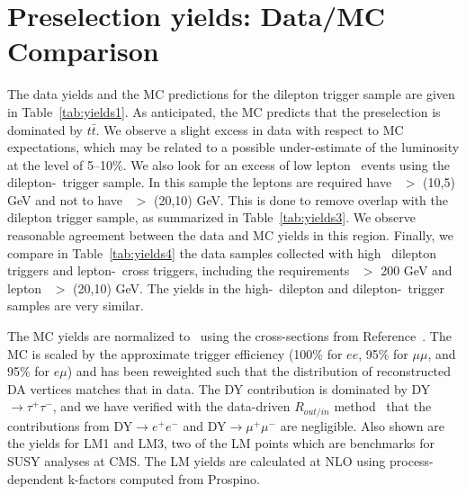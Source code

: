 \section{Preselection yields: Data/MC Comparison}
\label{sec:yields}

The data yields and the MC predictions for the dilepton trigger sample are given in Table~\ref{tab:yields1}. 
As anticipated, the MC predicts that the preselection is dominated by $t\bar{t}$.  
We observe a slight excess in data with respect to MC expectations, which may be
related to a possible under-estimate of the luminosity at the level of 5--10\%.
We also look for an excess of low lepton \pt\ events using the dilepton-\Ht\ trigger sample.
In this sample the leptons are required have \pt\ $>$ (10,5) GeV and not to have \pt\ $>$ (20,10) GeV.
This is done to remove overlap with the dilepton trigger sample, as summarized in Table~\ref{tab:yields3}. 
We observe reasonable agreement between the data and MC yields in this region.
Finally, we compare in Table~\ref{tab:yields4} the data samples collected with high \pt\ dilepton
triggers and lepton-\Ht\ cross triggers, including the requirements
\Ht\ $>$ 200 GeV and lepton \pt\ $>$ (20,10) GeV. 
The yields in the high-\pt\ dilepton and dilepton-\Ht\ trigger samples are very similar.

The MC yields are normalized to \lumi\ using the cross-sections
from Reference~\cite{ref:xsec}. 
The MC is scaled by the approximate trigger efficiency (100\% for $ee$,
95\% for $\mu\mu$, and 95\% for $e\mu$) and has been reweighted such that the distribution of 
reconstructed DA vertices matches that in data. 
The DY contribution is dominated by DY$\rightarrow \tau^+\tau^-$,
and we have verified with the data-driven $R_{out/in}$ method~\cite{ref:top} that the
contributions from DY$\to e^{+}e^{-}$ and DY$\to \mu^{+}\mu^{-}$ are negligible.
Also shown are the yields for LM1 and LM3, two of the LM 
points which are benchmarks for SUSY analyses at CMS. The LM yields
are calculated at NLO using process-dependent k-factors computed from Prospino.


